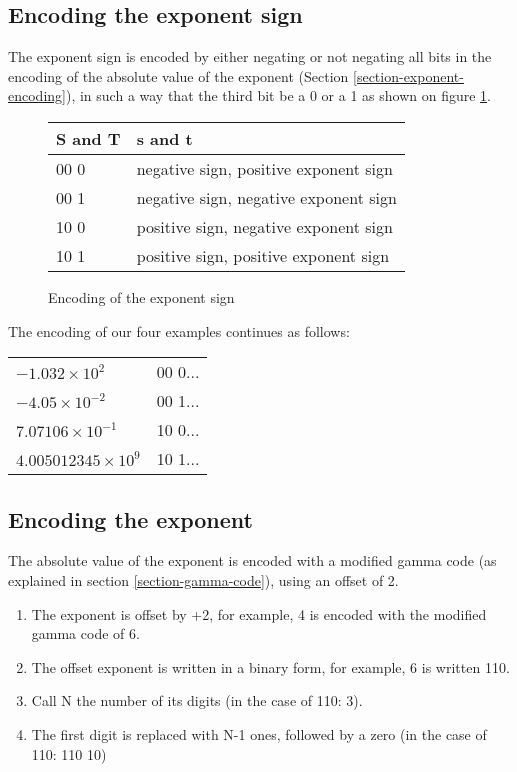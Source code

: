 \documentclass{acm_proc_article-sp}
\begin{document}
\subsection{Encoding the exponent sign}

The exponent sign is encoded by either negating or not negating all bits in the encoding of the absolute value of the exponent (Section \ref{section-exponent-encoding}), in such a way that the third bit be a 0 or a 1 as shown on figure \ref{figure-exponent-sign}.

\begin{figure}
\caption{Encoding of the exponent sign}
\label{figure-exponent-sign}
\center
\begin{tabular}{|l|l|}
\hline
S and T & s and t \\
\hline
00 0 &  negative sign, positive exponent sign\\
\hline
00 1 &  negative sign, negative exponent sign\\
\hline
10 0 & positive sign, negative exponent sign\\
\hline
10 1 & positive sign, positive exponent sign\\
\hline
\end{tabular}
\end{figure}

The encoding of our four examples continues as follows:

\begin{tabular}{l|l}
$- 1.032 \times 10^2$ & 00 0... \\

$-4.05 \times 10^{-2}$ & 00 1... \\

$7.07106 \times 10^{-1}$ & 10 0... \\

$4.005012345 \times 10^9$ & 10 1...\\
\end{tabular}

\subsection{Encoding the exponent}

The absolute value of the exponent is encoded with a modified gamma code (as explained in section \ref{section-gamma-code}), using an offset of 2.

\label{section-exponent-encoding}
\begin{enumerate}
\item The exponent is offset by +2, for example, 4 is encoded with the modified gamma code of 6. 
\item  The offset exponent is written in a binary form, for example, 6 is written 110.
\item  Call N the number of its digits (in the case of 110: 3).
\item  The first digit is replaced with N-1 ones, followed by a zero (in the case of 110: 110 10)
\end{enumerate}
\end{document}

